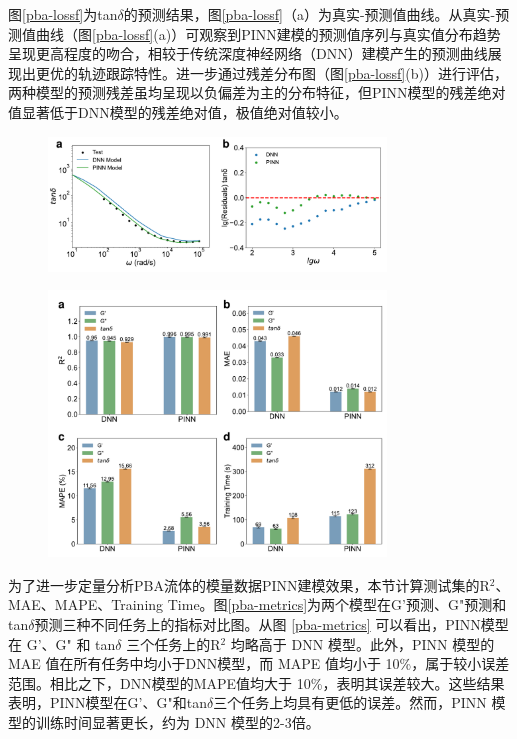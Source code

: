 图\ref{pba-lossf}为tan$\delta$的预测结果，图\ref{pba-lossf}（a）为真实-预测值曲线。从真实-预测值曲线（图\ref{pba-lossf}(a)）可观察到PINN建模的预测值序列与真实值分布趋势呈现更高程度的吻合，相较于传统深度神经网络（DNN）建模产生的预测曲线展现出更优的轨迹跟踪特性。进一步通过残差分布图（图\ref{pba-lossf}(b)）进行评估，两种模型的预测残差虽均呈现以负偏差为主的分布特征，但PINN模型的残差绝对值显著低于DNN模型的残差绝对值，极值绝对值较小。
\begin{figure}[htbp]
  \centering
  \includegraphics[width=0.8\textwidth]{Fig/pba-lossf.pdf}
\end{figure}
\begin{figure}[htbp]
  \centering
  \includegraphics[width=0.8\textwidth]{Fig/pba-metrics.pdf}
\end{figure}
为了进一步定量分析PBA流体的模量数据PINN建模效果，本节计算测试集的R$^2$、MAE、MAPE、Training Time。图\ref{pba-metrics}为两个模型在G'预测、G"预测和tan$\delta$预测三种不同任务上的指标对比图。从图 \ref{pba-metrics} 可以看出，PINN模型在 G'、G" 和 tan$\delta$ 三个任务上的R$^2$ 均略高于 DNN 模型。此外，PINN 模型的 MAE 值在所有任务中均小于DNN模型，而 MAPE 值均小于 10\%，属于较小误差范围。相比之下，DNN模型的MAPE值均大于 10\%，表明其误差较大。这些结果表明，PINN模型在G'、G"和tan$\delta$三个任务上均具有更低的误差。然而，PINN 模型的训练时间显著更长，约为 DNN 模型的2-3倍。

